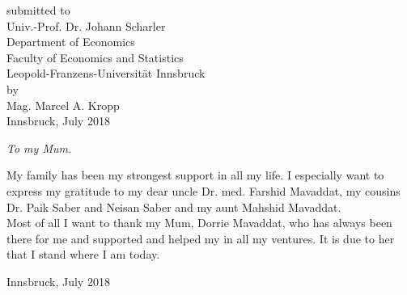 \documentclass[a4paper,11pt,listof=nochaptergap,oneside,pointednumbers,bibtotoc,bigheadings,liststotoc]{scrbook}
\theoremstyle{mysatz}
\theoremstyle{mydefinition}
\theoremstyle{mybemerkung}
\begin{document}
\begin{titlepage}
\begin{center}
        submitted to\\
        Univ.-Prof. Dr. Johann Scharler \\[10mm]
        Department of Economics\\
        Faculty of Economics and Statistics\\
        Leopold-Franzens-Universität Innsbruck \\[10mm]
        by \\ Mag. Marcel A. Kropp \\[10mm]
        Innsbruck, July 2018
    \end{center}
\end{titlepage}

\restoregeometry

\thispagestyle{empty} %
\null{}
    \begin{flushright}
       \large \textit{To my Mum.}\\
    \end{flushright}
\null


\newpage
\thispagestyle{empty} %


\vspace*{\fill}
My family has been my strongest support in all my life. I especially want to express my gratitude to my dear uncle Dr. med. Farshid Mavaddat, my cousins Dr. Paik Saber and Neisan Saber and my aunt Mahshid Mavaddat.\\
Most of all I want to thank my Mum, Dorrie Mavaddat, who has always been there for me and supported and helped my in all my ventures. It is due to her that I stand where I am today.
    \begin{flushright}
         Innsbruck, July 2018\\
    \end{flushright}
\vspace*{\fill}
%
\pagestyle{headings}
\end{document}
